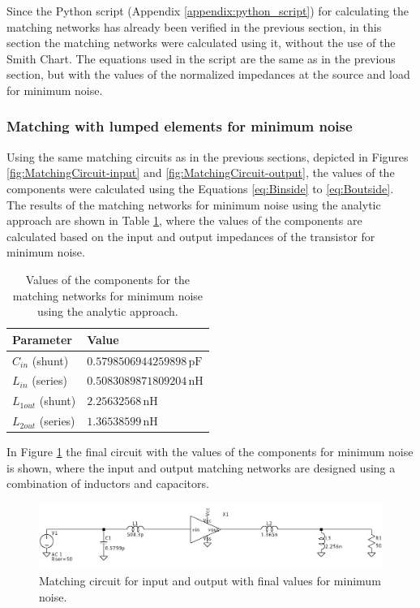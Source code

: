 Since the Python script (Appendix \ref{appendix:python_script}) for calculating the matching networks has already been verified in the previous section, in this section the matching networks were calculated using it, without the use of the Smith Chart. The equations used in the script are the same as in the previous section, but with the values of the normalized impedances at the source and load for minimum noise.

\subsubsection{Matching with lumped elements for minimum noise}

Using the same matching circuits as in the previous sections, depicted in Figures \ref{fig:MatchingCircuit-input} and \ref{fig:MatchingCircuit-output}, the values of the components were calculated using the Equations \ref{eq:Binside} to \ref{eq:Boutside}.
The results of the matching networks for minimum noise using the analytic approach are shown in Table \ref{tab:MatchingValues-noise}, where the values of the components are calculated based on the input and output impedances of the transistor for minimum noise.
\begin{table}[H]
    \centering
    \caption{Values of the components for the matching networks for minimum noise using the analytic approach.}
    \begin{tabularx}{\textwidth}{>{\centering\arraybackslash}X >{\centering\arraybackslash}X}
        \toprule
        \textbf{Parameter} & \textbf{Value} \\
        \midrule
        $C_{in}$ \quad (shunt)    & $0.5798506944259898\,\si{\pico\farad}$ \\
        \midrule
        $L_{in}$  \quad(series)   & $0.5083089871809204\,\si{\nano\henry}$\\
        \midrule
        $L_{1out}$ \quad (shunt)   & $2.25632568\,\si{\nano\henry}$ \\
        \midrule
        $L_{2out}$ \quad (series)   & $1.36538599\,\si{\nano\henry}$\\
        \bottomrule
    \end{tabularx}
    \label{tab:MatchingValues-noise}
\end{table}

In Figure \ref{fig:MatchingCircuit-noise} the final circuit with the values of the components for minimum noise is shown, where the input and output matching networks are designed using a combination of inductors and capacitors.
\begin{figure}[H]
    \centering
    \includegraphics[width=1\textwidth]{Images/LC-noise-matching-circuit.png}
    \caption{Matching circuit for input and output with final values for minimum noise.}
    \label{fig:MatchingCircuit-noise}
\end{figure}

